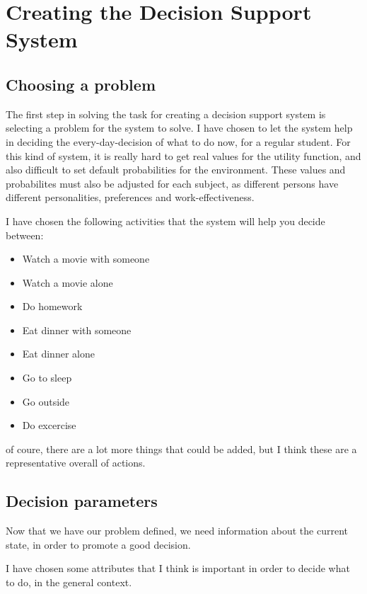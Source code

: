 \section{Creating the Decision Support System}
\subsection{Choosing a problem}
The first step in solving the task for creating a decision support system is
selecting a problem for the system to solve. I have chosen to let the system
help in deciding the every-day-decision of what to do now, for a
regular student. For this kind of system, it is really hard to get real values
for the utility function, and also difficult to set default probabilities for
the environment. These values and probabilites must also be adjusted for each
subject, as different persons have different personalities, preferences and
work-effectiveness.


I have chosen the following activities that the system will help you decide
between:
\begin{itemize}
  \item Watch a movie with someone
  \item Watch a movie alone
  \item Do homework
  \item Eat dinner with someone
  \item Eat dinner alone
  \item Go to sleep
  \item Go outside
  \item Do excercise
\end{itemize}
of coure, there are a lot more things that could be added, but I think these are
a representative overall of actions.

\subsection{Decision parameters}
Now that we have our problem defined, we need information
about the current state, in order to promote a good decision.

I have chosen some attributes that I think is important in order to decide what
to do, in the general context.

